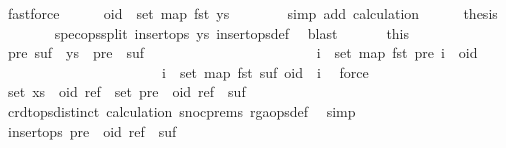 \begin{isabellebody}
\ fastforce\isanewline
\ \ \ \ \isamarkupfalse%
\ {\isachardoublequoteopen}oid\ {\isasymnotin}\ set\ {\isacharparenleft}map\ fst\ ys{\isacharparenright}{\isachardoublequoteclose}\isanewline
\ \ \ \ \ \ \isamarkupfalse%
\ {\isacharparenleft}simp\ add{\isacharcolon}\ calculation{\isacharparenleft}{}{\isacharparenright}{\isacharparenright}\isanewline
\ \ \ \ \isamarkupfalse%
\ {\isacharquery}thesis\isanewline
\ \ \ \ \ \ \isamarkupfalse%
\ spec{\isacharunderscore}ops{\isacharunderscore}split\ {\isacartoucheopen}insert{\isacharunderscore}ops\ ys{\isacartoucheclose}\ insert{\isacharunderscore}ops{\isacharunderscore}def\ \isamarkupfalse%
\ blast\isanewline
\ \ \isamarkupfalse%
\isanewline
\ \ \isamarkupfalse%
\ this\ \isamarkupfalse%
\ pre\ suf\ \ {\isachardoublequoteopen}ys\ {\isacharequal}\ pre\ {\isacharat}\ suf{\isachardoublequoteclose}\ \isanewline
\ \ \ \ \ \ \ \ \ \ \ \ \ \ \ \ \ \ \ \ \ \ \ {\isachardoublequoteopen}{\isasymforall}i\ {\isasymin}\ set\ {\isacharparenleft}map\ fst\ pre{\isacharparenright}{\isachardot}\ i\ {\isacharless}\ oid{\isachardoublequoteclose}\ \isanewline
\ \ \ \ \ \ \ \ \ \ \ \ \ \ \ \ \ \ \ \ \ \ \ {\isachardoublequoteopen}{\isasymforall}i\ {\isasymin}\ set\ {\isacharparenleft}map\ fst\ suf{\isacharparenright}{\isachardot}\ oid\ {\isacharless}\ i{\isachardoublequoteclose}\ \isamarkupfalse%
\ force\isanewline
\ \ \isamarkupfalse%
\ \isamarkupfalse%
\ {\isachardoublequoteopen}set\ {\isacharparenleft}xs\ {\isacharat}\ {\isacharbrackleft}{\isacharparenleft}oid{\isacharcomma}\ ref{\isacharparenright}{\isacharbrackright}{\isacharparenright}\ {\isacharequal}\ set\ {\isacharparenleft}pre\ {\isacharat}\ {\isacharbrackleft}{\isacharparenleft}oid{\isacharcomma}\ ref{\isacharparenright}{\isacharbrackright}\ {\isacharat}\ suf{\isacharparenright}{\isachardoublequoteclose}\isanewline
\ \ \ \ \isamarkupfalse%
\ crdt{\isacharunderscore}ops{\isacharunderscore}distinct\ calculation\ snoc{\isachardot}prems\ rga{\isacharunderscore}ops{\isacharunderscore}def\ \isamarkupfalse%
\ simp\isanewline
\ \ \isamarkupfalse%
\ \isamarkupfalse%
\ {\isachardoublequoteopen}insert{\isacharunderscore}ops\ {\isacharparenleft}pre\ {\isacharat}\ {\isacharbrackleft}{\isacharparenleft}oid{\isacharcomma}\ ref{\isacharparenright}{\isacharbrackright}\ {\isacharat}\ suf{\isacharparenright}{\isachardoublequoteclose}\isanewline

\end{isabellebody}
